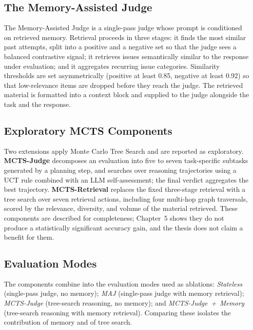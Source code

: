 \documentclass[14pt,a4paper]{extreport}
\begin{document}
\subsection{The Memory-Assisted Judge}

The Memory-Assisted Judge is a single-pass judge whose prompt is conditioned on retrieved memory. Retrieval proceeds in three stages: it finds the most similar past attempts, split into a positive and a negative set so that the judge sees a balanced contrastive signal; it retrieves issues semantically similar to the response under evaluation; and it aggregates recurring issue categories. Similarity thresholds are set asymmetrically (positive at least 0.85, negative at least 0.92) so that low-relevance items are dropped before they reach the judge. The retrieved material is formatted into a context block and supplied to the judge alongside the task and the response.

\subsection{Exploratory MCTS Components}

Two extensions apply Monte Carlo Tree Search and are reported as exploratory. \textbf{MCTS-Judge} decomposes an evaluation into five to seven task-specific subtasks generated by a planning step, and searches over reasoning trajectories using a UCT rule combined with an LLM self-assessment; the final verdict aggregates the best trajectory. \textbf{MCTS-Retrieval} replaces the fixed three-stage retrieval with a tree search over seven retrieval actions, including four multi-hop graph traversals, scored by the relevance, diversity, and volume of the material retrieved. These components are described for completeness; Chapter~5 shows they do not produce a statistically significant accuracy gain, and the thesis does not claim a benefit for them.

\subsection{Evaluation Modes}

The components combine into the evaluation modes used as ablations: \emph{Stateless} (single-pass judge, no memory); \emph{MAJ} (single-pass judge with memory retrieval); \emph{MCTS-Judge} (tree-search reasoning, no memory); and \emph{MCTS-Judge~+~Memory} (tree-search reasoning with memory retrieval). Comparing these isolates the contribution of memory and of tree search.
\end{document}
